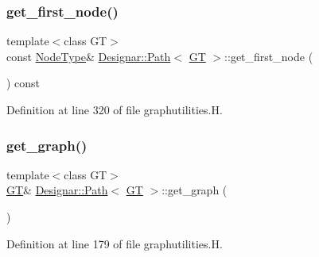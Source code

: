 \subsubsection{\texorpdfstring{get\+\_\+first\+\_\+node()}{get\_first\_node()}\hspace{0.1cm}{\footnotesize\ttfamily [2/2]}}
{\footnotesize\ttfamily template$<$class GT$>$ \\
const \hyperlink{class_designar_1_1_path_a7b499fd50e96e3360968d4cfef7a3736}{Node\+Type}\& \hyperlink{class_designar_1_1_path}{Designar\+::\+Path}$<$ \hyperlink{demo-buildgraph_8_c_a3001c40d2c31ca87ed96cd7d1334a55e}{GT} $>$\+::get\+\_\+first\+\_\+node (\begin{DoxyParamCaption}{ }\end{DoxyParamCaption}) const\hspace{0.3cm}{\ttfamily [inline]}}



Definition at line 320 of file graphutilities.\+H.

\mbox{\label{class_designar_1_1_path_a0d4ef1ffdb4bcf2b34267e33c2177773}} 
\subsubsection{\texorpdfstring{get\+\_\+graph()}{get\_graph()}}
{\footnotesize\ttfamily template$<$class GT$>$ \\
\hyperlink{demo-buildgraph_8_c_a3001c40d2c31ca87ed96cd7d1334a55e}{GT}\& \hyperlink{class_designar_1_1_path}{Designar\+::\+Path}$<$ \hyperlink{demo-buildgraph_8_c_a3001c40d2c31ca87ed96cd7d1334a55e}{GT} $>$\+::get\+\_\+graph (\begin{DoxyParamCaption}{ }\end{DoxyParamCaption})\hspace{0.3cm}{\ttfamily [inline]}}



Definition at line 179 of file graphutilities.\+H.

\mbox{\label{class_designar_1_1_path_aabe99f57d8d1c3ee500f5d6655b4fe68}} 
